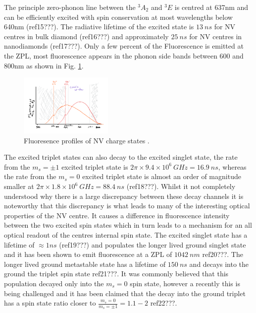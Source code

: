 \documentclass[,prl,twocolumn]{revtex4}
\begin{document}
The principle zero-phonon line between the $^3A_2$ and $^3E$ is centred at 637nm and can be efficiently excited with spin conservation at most wavelengths below 640nm (ref15???). The radiative lifetime of the excited state is $\SI{13}{ns}$ for NV centres in bulk diamond (ref16???) and approximately $\SI{25}{ns}$ for NV centres in nanodiamonds (ref17???). Only a few percent of the Fluorescence is emitted at the ZPL, most fluorescence appears in the phonon side bands between 600 and 800nm as shown in Fig. \ref{FigFluoro}.

\begin{figure}[t]
  \centering
  \includegraphics[width=0.4\textwidth]{Fluoro.png} 
 \caption{ Fluoresence profiles of NV charge states .} \label{FigFluoro}
\end{figure}

The excited triplet states can also decay to the excited singlet state, the rate from the $m_s=\pm1$ excited triplet state is $2\pi\times9.4\times10^6\SI{}{GHz} = \SI{16.9}{ns}$, whereas the rate from the $m_s=0$ excited triplet state is almost an order of magnitude smaller at $ 2\pi\times1.8\times10^6 \SI{}{GHz} = \SI{88.4}{ns}$ (ref18???). Whilst it not completely understood why there is a large discrepancy between these decay channels it is noteworthy that this discrepancy is what leads to many of the interesting optical properties of the NV centre. It causes a difference in fluorescence intensity between the two excited spin states which in turn leads to a mechanism for an all optical readout of the centres internal spin state. The excited singlet state has a lifetime of $\approx\si{1}{ns}$ (ref19???) and populates the longer lived ground singlet state and it has been shown to emit fluorescence at a ZPL of $\SI{1042}{nm}$ ref20???. The longer lived ground metastable state has a lifetime of $\SI{150}{ns}$ and decays into the ground the triplet spin state ref21???. It was commonly believed that this population decayed only into the $m_s=0$ spin state, however a recently this is being challenged and it has been claimed that the decay into the ground triplet has a spin state ratio closer to $\frac{m_s=0}{m_s=\pm1} = 1.1-2$ ref22???. 
\end{document}
